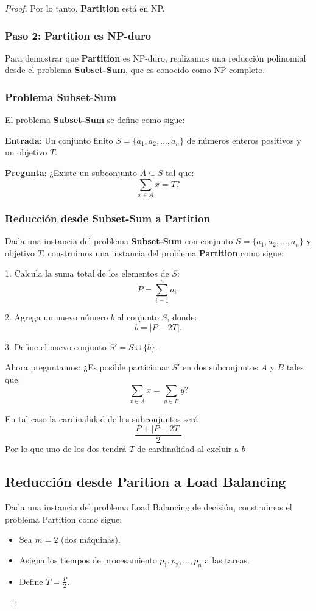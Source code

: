 \documentclass{report}
\begin{document}
\begin{proof}
	Por lo tanto, \textbf{Partition} está en NP.
	
	\subsubsection*{Paso 2: Partition es NP-duro}
	
	Para demostrar que \textbf{Partition} es NP-duro, realizamos una reducción polinomial desde el problema \textbf{Subset-Sum}, que es conocido como NP-completo.
	
	\subsubsection*{Problema Subset-Sum}
	
	El problema \textbf{Subset-Sum} se define como sigue:
	
	\textbf{Entrada}: Un conjunto finito $ S = \{a_1, a_2, \dots, a_n\} $ de números enteros positivos y un objetivo $ T $.
	
	\textbf{Pregunta}: ¿Existe un subconjunto $ A \subseteq S $ tal que:
	\[
	\sum_{x \in A} x = T?
	\]
	
	\subsubsection*{Reducción desde Subset-Sum a Partition}
	
	Dada una instancia del problema \textbf{Subset-Sum} con conjunto $ S = \{a_1, a_2, \dots, a_n\} $ y objetivo $ T $, construimos una instancia del problema \textbf{Partition} como sigue:
	
	1. Calcula la suma total de los elementos de $ S $:
	\[
	P = \sum_{i=1}^n a_i.
	\]
	
	2. Agrega un nuevo número $ b $ al conjunto $ S $, donde:
	\[
	b = |P - 2T|.
	\]
	
	3. Define el nuevo conjunto $ S' = S \cup \{b\} $.
	
	Ahora preguntamos: ¿Es posible particionar $ S' $ en dos subconjuntos $ A $ y $ B $ tales que:
	\[
	\sum_{x \in A} x = \sum_{y \in B} y?
	\]
	
	En tal caso la cardinalidad de los subconjuntos será $$\frac{P + |P - 2T|}{2}$$ Por lo que uno de los dos tendrá $T$ de cardinalidad al excluir a $b$
	
	
	
	
	\subsection*{Reducción desde Parition a Load Balancing}
	Dada una instancia del problema Load Balancing de decisión, construimos el problema Partition como sigue:
	\begin{itemize}
		\item Sea $ m = 2 $ (dos máquinas).
		\item Asigna los tiempos de procesamiento $ p_1, p_2, \dots, p_n $ a las tareas.
		\item Define $ T = \frac{P}{2} $.
	\end{itemize}
	

\end{proof}
\end{document}
